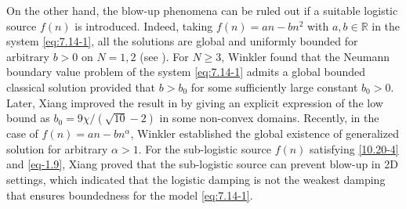 \documentclass[reqno]{amsart}
\begin{document}
On the other hand, the blow-up phenomena can be ruled out if a suitable logistic source 
$f(n)$ is introduced. Indeed, taking $f(n)=an-bn^2$ with $a, b \in
\mathbb{R}$ in the system \eqref{eq:7.14-1}, all the solutions are global and uniformly 
bounded for arbitrary \( b > 0 \) on \( N = 1, 2 \) (see
\cite{Xiang2018-C,Osaki-2002}). 
For \( N \geq 3 \), Winkler \cite{Winkler2010} found that the Neumann boundary value 
problem of the system \eqref{eq:7.14-1} admits a global bounded classical
solution provided that \( b>b_0\) for some sufficiently large constant $b_0>0$. 
Later, Xiang \cite{Xiang2018-J} improved the result in \cite{Winkler2010} by giving an
explicit expression of the low bound as \( b_0=9\chi/(\sqrt{10} - 2) \) 
in some non-convex domains. Recently, in the case of \( f(n) = an -b n^\alpha\),  
Winkler \cite{Winkler2023} established the global existence of generalized solution  
for arbitrary \( \alpha > 1 \). For the
sub-logistic source $f(n)$ satisfying \eqref{10.20-4} and 
\eqref{eq-1.9}, Xiang \cite{Xiang2018-2} proved that the sub-logistic source can 
prevent blow-up in 2D settings, which indicated that the logistic damping is not
the weakest damping that ensures boundedness for the model \eqref{eq:7.14-1}.
\end{document}
